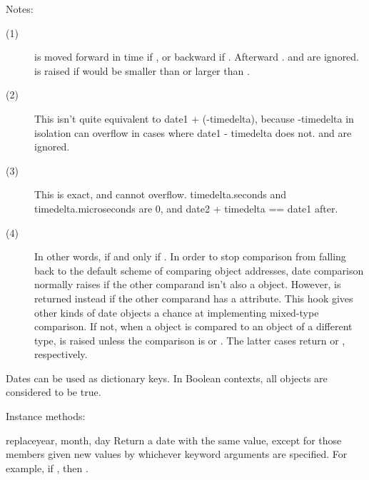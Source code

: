 Notes:
\begin{description}

\item[(1)]
  is moved forward in time if , or backward if .  Afterward
    .
     and
     are ignored.
     is raised if 
    would be smaller than  or larger than
    .

\item[(2)]
 This isn't quite equivalent to date1 +
   (-timedelta), because -timedelta in isolation can overflow in cases
   where date1 - timedelta does not.  
   and  are ignored.

\item[(3)]
This is exact, and cannot overflow.  timedelta.seconds and
    timedelta.microseconds are 0, and date2 + timedelta == date1
    after.

\item[(4)]
In other words, 
   if and only if .
In order to stop comparison from falling back to the default
scheme of comparing object addresses, date comparison
normally raises  if the other comparand
isn't also a  object.  However, 
is returned instead if the other comparand has a
 attribute.  This hook gives other kinds of
date objects a chance at implementing mixed-type comparison.
If not, when a  object is
compared to an object of a different type,  is
raised unless the comparison is \code{==} or \code{!=}.  The latter
cases return  or , respectively.

\end{description}


Dates can be used as dictionary keys. In Boolean contexts, all
 objects are considered to be true.

Instance methods:

\begin{methoddesc}{replace}{year, month, day}
  Return a date with the same value, except for those members given
  new values by whichever keyword arguments are specified.  For
  example, if , then
  .
\end{methoddesc}

